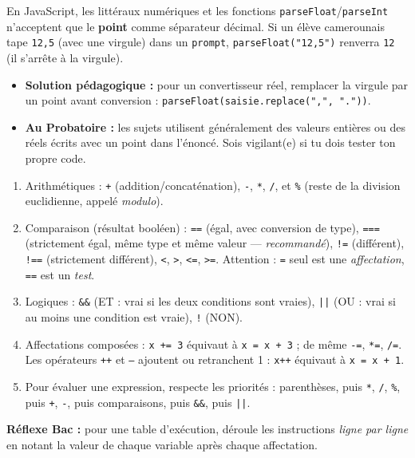 \documentclass[11pt]{article}
\newcommand{\cle}[1]{{\popxbold\color{popdark}#1}}
\begin{document}
\begin{attention}
En JavaScript, les littéraux numériques et les fonctions \texttt{parseFloat}/\texttt{parseInt} n'acceptent que le \textbf{point} comme séparateur décimal.
Si un élève camerounais tape \texttt{12,5} (avec une virgule) dans un \texttt{prompt}, \texttt{parseFloat("12,5")} renverra \texttt{12} (il s'arrête à la virgule).
\begin{itemize}
  \item \textbf{Solution pédagogique :} pour un convertisseur réel, remplacer la virgule par un point avant conversion : \texttt{parseFloat(saisie.replace(",", "."))}.
  \item \textbf{Au Probatoire :} les sujets utilisent généralement des valeurs entières ou des réels écrits avec un point dans l'énoncé. Sois vigilant(e) si tu dois tester ton propre code.
\end{itemize}
\end{attention}

\begin{methode}
\begin{enumerate}
  \item \cle{Arithmétiques} : \texttt{+} (addition/concaténation), \texttt{-}, \texttt{*}, \texttt{/}, et \texttt{\%} (reste de la division euclidienne, appelé \emph{modulo}).
  \item \cle{Comparaison} (résultat booléen) : \texttt{==} (égal, avec conversion de type), \texttt{===} (strictement égal, même type et même valeur — \emph{recommandé}), \texttt{!=} (différent), \texttt{!==} (strictement différent), \texttt{<}, \texttt{>}, \texttt{<=}, \texttt{>=}. Attention : \texttt{=} seul est une \emph{affectation}, \texttt{==} est un \emph{test}.
  \item \cle{Logiques} : \texttt{\&\&} (ET : vrai si les deux conditions sont vraies), \texttt{||} (OU : vrai si au moins une condition est vraie), \texttt{!} (NON).
  \item \cle{Affectations composées} : \texttt{x += 3} équivaut à \texttt{x = x + 3} ; de même \texttt{-=}, \texttt{*=}, \texttt{/=}. Les opérateurs \texttt{++} et \texttt{--} ajoutent ou retranchent 1 : \texttt{x++} équivaut à \texttt{x = x + 1}.
  \item Pour évaluer une expression, respecte les priorités : parenthèses, puis \texttt{*}, \texttt{/}, \texttt{\%}, puis \texttt{+}, \texttt{-}, puis comparaisons, puis \texttt{\&\&}, puis \texttt{||}.
\end{enumerate}
\textbf{Réflexe Bac :} pour une table d'exécution, déroule les instructions \emph{ligne par ligne} en notant la valeur de chaque variable après chaque affectation.
\end{methode}
\end{document}
